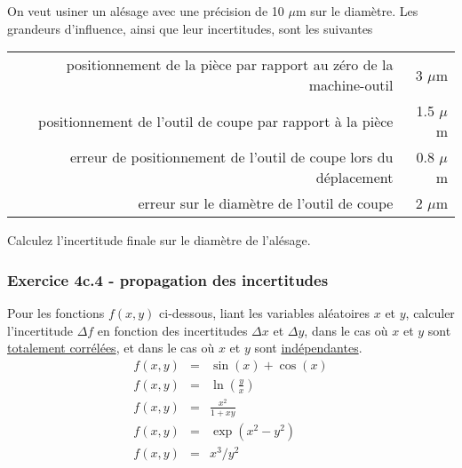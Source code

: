 \documentclass[main.tex]{subfiles}
\begin{document}
On veut usiner un alésage avec une précision de 10 $\mu$m sur le diamètre. Les grandeurs d'influence, ainsi que leur incertitudes, sont les suivantes
\begin{center}
    \begin{tabular}{r|r}
        positionnement de la pièce par rapport au zéro de la machine-outil & 3 $\mu$m   \\
        positionnement de l'outil de coupe par rapport à la pièce          & 1.5 $\mu$m \\
        erreur de positionnement de l'outil de coupe lors du déplacement   & 0.8 $\mu$m \\
        erreur sur le diamètre de l'outil de coupe                         & 2 $\mu$m
    \end{tabular}
\end{center}
Calculez l'incertitude finale sur le diamètre de l'alésage.

\subsubsection*{Exercice 4c.4 - propagation des incertitudes}

Pour les fonctions $f(x,y)$ ci-dessous, liant les variables aléatoires $x$ et $y$, calculer l'incertitude $\Delta f$ en fonction des incertitudes $\Delta x$ et $\Delta y$, dans le cas où $x$ et $y$ sont \underline{totalement corrélées}, et dans le cas où $x$ et $y$ sont \underline{indépendantes}.
\begin{eqnarray*}
    f(x,y)&=&\sin(x)+\cos(x) \\
    f(x,y)&=&\ln\left(\frac{y}{x}\right) \\
    f(x,y)&=&\frac{x^2}{1+xy} \\
    f(x,y)&=&\exp(x^2-y^2) \\
    f(x,y)&=&x^3/y^2 \\
\end{eqnarray*}

\fi
\end{document}
